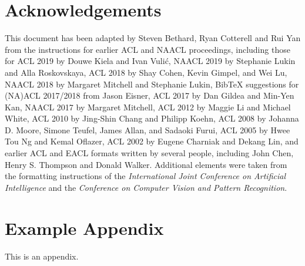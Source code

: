 \documentclass[11pt]{article}
\begin{document}
\section*{Acknowledgements}

This document has been adapted
by Steven Bethard, Ryan Cotterell and Rui Yan
from the instructions for earlier ACL and NAACL proceedings, including those for 
ACL 2019 by Douwe Kiela and Ivan Vuli\'{c},
NAACL 2019 by Stephanie Lukin and Alla Roskovskaya, 
ACL 2018 by Shay Cohen, Kevin Gimpel, and Wei Lu, 
NAACL 2018 by Margaret Mitchell and Stephanie Lukin,
Bib\TeX{} suggestions for (NA)ACL 2017/2018 from Jason Eisner,
ACL 2017 by Dan Gildea and Min-Yen Kan, 
NAACL 2017 by Margaret Mitchell, 
ACL 2012 by Maggie Li and Michael White, 
ACL 2010 by Jing-Shin Chang and Philipp Koehn, 
ACL 2008 by Johanna D. Moore, Simone Teufel, James Allan, and Sadaoki Furui, 
ACL 2005 by Hwee Tou Ng and Kemal Oflazer, 
ACL 2002 by Eugene Charniak and Dekang Lin, 
and earlier ACL and EACL formats written by several people, including
John Chen, Henry S. Thompson and Donald Walker.
Additional elements were taken from the formatting instructions of the \emph{International Joint Conference on Artificial Intelligence} and the \emph{Conference on Computer Vision and Pattern Recognition}.




\appendix

\section{Example Appendix}
\label{sec:appendix}

This is an appendix.
\end{document}
